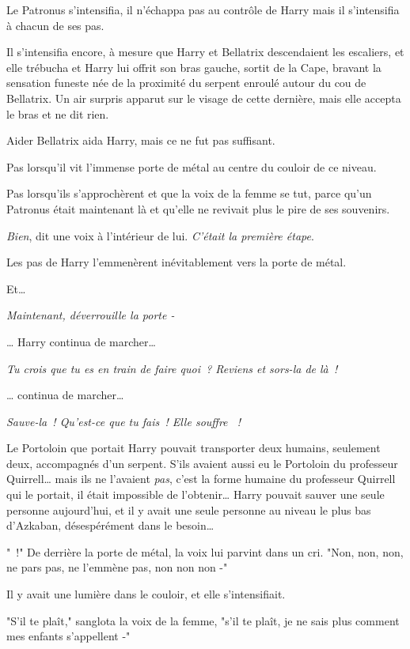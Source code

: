 Le Patronus s'intensifia, il n'échappa pas au contrôle de Harry mais il s'intensifia à chacun de ses pas.

Il s'intensifia encore, à mesure que Harry et Bellatrix descendaient les escaliers, et elle trébucha et Harry lui offrit son bras gauche, sortit de la Cape, bravant la sensation funeste née de la proximité du serpent enroulé autour du cou de Bellatrix. Un air surpris apparut sur le visage de cette dernière, mais elle accepta le bras et ne dit rien.

Aider Bellatrix aida Harry, mais ce ne fut pas suffisant.

Pas lorsqu'il vit l'immense porte de métal au centre du couloir de ce niveau.

Pas lorsqu'ils s'approchèrent et que la voix de la femme se tut, parce qu'un Patronus était maintenant là et qu'elle ne revivait plus le pire de ses souvenirs.

\emph{Bien}, dit une voix à l'intérieur de lui. \emph{C'était la première étape}.

Les pas de Harry l'emmenèrent inévitablement vers la porte de métal.

Et…

\emph{Maintenant, déverrouille la porte -}

… Harry continua de marcher…

\emph{Tu crois que tu es en train de faire quoi~? Reviens et sors-la de là~!}

… continua de marcher…

\emph{Sauve-la~! Qu'est-ce que tu fais~! Elle souffre ~!}

Le Portoloin que portait Harry pouvait transporter deux humains, seulement deux, accompagnés d'un serpent. S'ils avaient aussi eu le Portoloin du professeur Quirrell… mais ils ne l'avaient \emph{pas}, c'est la forme humaine du professeur Quirrell qui le portait, il était impossible de l'obtenir… Harry pouvait sauver une seule personne aujourd'hui, et il y avait une seule personne au niveau le plus bas d'Azkaban, désespérément dans le besoin…

"~!" De derrière la porte de métal, la voix lui parvint dans un cri. "Non, non, non, ne pars pas, ne l'emmène pas, non non non -"

Il y avait une lumière dans le couloir, et elle s'intensifiait.

"S'il te plaît," sanglota la voix de la femme, "s'il te plaît, je ne sais plus comment mes enfants s'appellent -"

